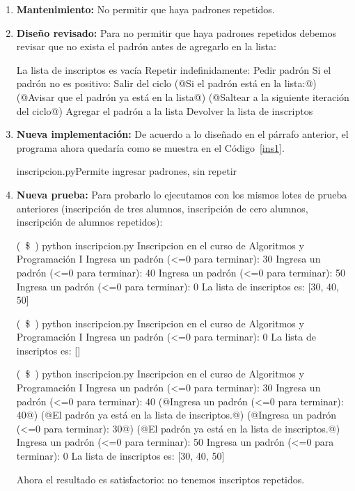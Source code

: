 \begin{enumerate}
Evidentemente el programa funciona de acuerdo a lo especificado, pero
hay algo que no tuvimos en cuenta: permite inscribir a una misma persona
más de una vez.

\item {\bf Mantenimiento:} No permitir que haya padrones repetidos.

\item {\bf Diseño revisado:} Para no permitir que haya padrones repetidos
debemos revisar que no exista el padrón antes de agregarlo en la lista:

\begin{codigo-nohl-sn}
La lista de inscriptos es vacía
Repetir indefinidamente:
    Pedir padrón
    Si el padrón no es positivo:
        Salir del ciclo
    (@Si el padrón está en la lista:@)
        (@Avisar que el padrón ya está en la lista@)
        (@Saltear a la siguiente iteración del ciclo@)
    Agregar el padrón a la lista
Devolver la lista de inscriptos
\end{codigo-nohl-sn}

\item {\bf Nueva implementación:}
De acuerdo a lo diseñado en el párrafo anterior, el programa ahora quedaría
como se muestra en el Código~\ref{ins1}.

\begin{codigo}{inscripcion.py}{Permite ingresar padrones, sin repetir}
\label{ins1}

\end{codigo}

\item {\bf Nueva prueba:}
Para probarlo lo ejecutamos con los mismos lotes de prueba anteriores
(inscripción de tres alumnos, inscripción de cero alumnos, inscripción de
alumnos repetidos):

\begin{codigo-nohl-sn}
(~\$~) python inscripcion.py
Inscripcion en el curso de Algoritmos y Programación I
Ingresa un padrón (<=0 para terminar): 30
Ingresa un padrón (<=0 para terminar): 40
Ingresa un padrón (<=0 para terminar): 50
Ingresa un padrón (<=0 para terminar): 0
La lista de inscriptos es: [30, 40, 50]

(~\$~) python inscripcion.py
Inscripcion en el curso de Algoritmos y Programación I
Ingresa un padrón (<=0 para terminar): 0
La lista de inscriptos es: []

(~\$~) python inscripcion.py
Inscripcion en el curso de Algoritmos y Programación I
Ingresa un padrón (<=0 para terminar): 30
Ingresa un padrón (<=0 para terminar): 40
(@Ingresa un padrón (<=0 para terminar): 40@)
(@El padrón ya está en la lista de inscriptos.@)
(@Ingresa un padrón (<=0 para terminar): 30@)
(@El padrón ya está en la lista de inscriptos.@)
Ingresa un padrón (<=0 para terminar): 50
Ingresa un padrón (<=0 para terminar): 0
La lista de inscriptos es: [30, 40, 50]
\end{codigo-nohl-sn}

Ahora el resultado es satisfactorio: no tenemos inscriptos repetidos.

\end{enumerate}


